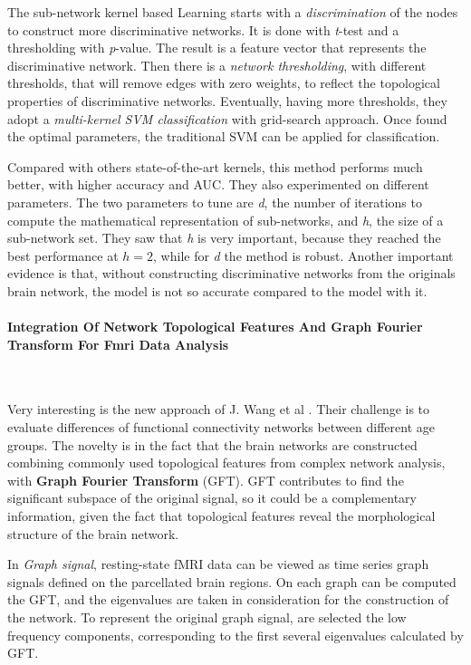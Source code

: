 The sub-network kernel based Learning starts with a \textit{discrimination} of the nodes to construct more discriminative networks. It is done with \textit{t}-test and a thresholding with \textit{p}-value. The result is a feature vector that represents the discriminative network. Then there is a \textit{network thresholding}, with different thresholds, that will remove edges with zero weights, to reflect the topological properties of discriminative networks. Eventually, having more thresholds, they adopt a \textit{multi-kernel SVM classification} with grid-search approach. Once found the optimal parameters, the traditional SVM can be applied for classification.
\vspace{0.5cm}

Compared with others state-of-the-art kernels, this method performs much better, with higher accuracy and AUC. They also experimented on different parameters. The two parameters to tune are \textit{d}, the number of iterations to compute the mathematical representation of sub-networks, and \textit{h}, the size of a sub-network set. They saw that \textit{h} is very important, because they reached the best performance at $ h = 2 $, while for \textit{d} the method is robust. 
Another important evidence is that, without constructing discriminative networks from the originals brain network, the model is not so accurate compared to the model with it. 

\paragraph{Integration Of Network Topological Features And Graph Fourier Transform For Fmri Data Analysis}\
\vspace{0.5cm}

Very interesting is the new approach of J. Wang et al \cite{8363530}. Their challenge is to evaluate differences of functional connectivity networks between different age groups. The novelty is in the fact that the brain networks are constructed combining commonly used topological features from complex network analysis, with \textbf{Graph Fourier Transform} (GFT). GFT contributes to find the significant subspace of the original signal, so it could be a complementary information, given the fact that topological features reveal the morphological structure of the brain network. 
\vspace{0.5cm}

In \textit{Graph signal}, resting-state fMRI data can be viewed as time series graph signals defined on the parcellated brain regions. On each graph can be computed the GFT, and the eigenvalues are taken in consideration for the construction of the network. To represent the original graph signal, are selected the low frequency components, corresponding to the first several eigenvalues calculated by GFT. 
\vspace{0.5cm}

